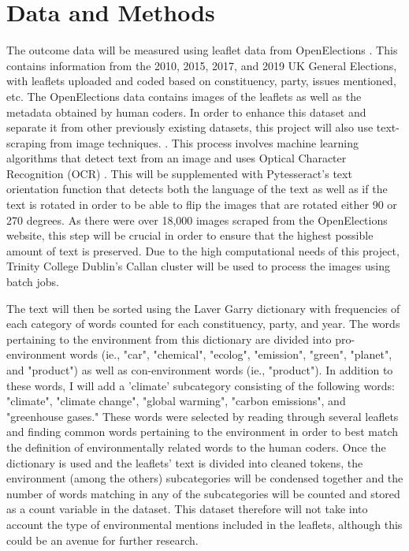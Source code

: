 \documentclass[preprint]{elsarticle} %
\begin{document}
	
	\newpage
	

	
	\section{Data and Methods}

The outcome data will be measured using leaflet data from OpenElections \citep{milazzo2020openelections}. This contains information from the 2010, 2015, 2017, and 2019 UK General Elections, with leaflets uploaded and coded based on constituency, party, issues mentioned, etc. The OpenElections data contains images of the leaflets as well as the metadata obtained by human coders. In order to enhance this dataset and separate it from other previously existing datasets, this project will also use text-scraping from image techniques. \citep{KerasocrKeras_ocrDocumentation,hoffstaetterPytesseractPythontesseractPython}. This process involves machine learning algorithms that detect text from an image and uses Optical Character Recognition (OCR) \citep{madhugiriExtractTextImages2022}. This will be supplemented with Pytesseract's text orientation function that detects both the language of the text as well as if the text is rotated \citep{rosebrockCorrectingTextOrientation2022} in order to be able to flip the images that are rotated either 90 or 270 degrees. As there were over 18,000 images scraped from the OpenElections website, this step will be crucial in order to ensure that the highest possible amount of text is preserved. Due to the high computational needs of this project, Trinity College Dublin's Callan cluster will be used to process the images using batch jobs.



The text will then be sorted using the Laver Garry dictionary \citep{laverEstimatingPolicyPositions2000} with frequencies of each category of words counted for each constituency, party, and year. The words pertaining to the environment from this dictionary are divided into pro-environment words (ie., "car", "chemical", "ecolog", "emission", "green", "planet", and "product") as well as con-environment words (ie., "product"). In addition to these words, I will add a 'climate' subcategory consisting of the following words: "climate", "climate change", "global warming", "carbon emissions", and "greenhouse gases." These words were selected by reading through several leaflets and finding common words pertaining to the environment in order to best match the definition of environmentally related words to the human coders. Once the dictionary is used and the leaflets' text is divided into cleaned tokens, the environment (among the others) subcategories will be condensed together and the number of words matching in any of the subcategories will be counted and stored as a count variable in the dataset. This dataset therefore will not take into account the type of environmental mentions included in the leaflets, although this could be an avenue for further research. 
\end{document}
